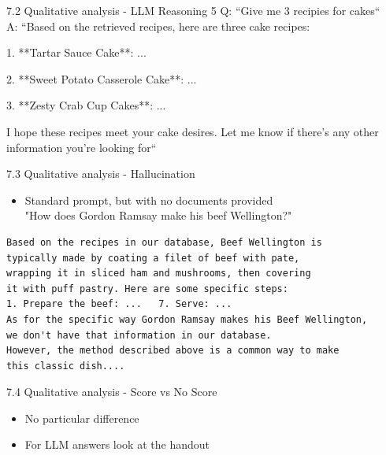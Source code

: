 \documentclass{beamer}
\begin{document}
\begin{frame}{7.2 Qualitative analysis - LLM Reasoning 5}
  Q: ``Give me 3 recipies for cakes``\\
  A: ``Based on the retrieved recipes, here are three cake recipes:

  1. **Tartar Sauce Cake**: ...

  2. **Sweet Potato Casserole Cake**: ...

  3. **Zesty Crab Cup Cakes**: ...

  I hope these recipes meet your cake desires. Let me know if there's any other information you're looking for``
\end{frame}

\begin{frame}[fragile]{7.3 Qualitative analysis - Hallucination}
  \begin{itemize}
    \item Standard prompt, but with no documents provided \\
          "How does Gordon Ramsay make his beef Wellington?"
  \end{itemize}
  \begin{verbatim}
Based on the recipes in our database, Beef Wellington is 
typically made by coating a filet of beef with pate,
wrapping it in sliced ham and mushrooms, then covering 
it with puff pastry. Here are some specific steps:
1. Prepare the beef: ...   7. Serve: ...
As for the specific way Gordon Ramsay makes his Beef Wellington,
we don't have that information in our database.
However, the method described above is a common way to make
this classic dish....
  \end{verbatim}
\end{frame}

\begin{frame}{7.4 Qualitative analysis - Score vs No Score}
  \begin{itemize}
    \item No particular difference
    \item For LLM answers look at the handout
  \end{itemize}
\end{frame}
\end{document}

